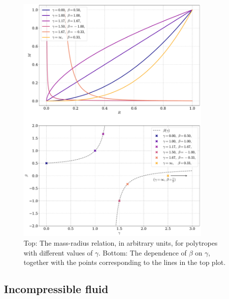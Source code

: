 \begin{figure}
    \centering
    \includegraphics[width=0.85\textwidth]{../scripts/figurer/mass_radius_relation_polytropes.pdf}
    \caption{
        Top: The mass-radius relation, in arbitrary units, for polytropes with different values of $\gamma$. Bottom: The dependence of $\beta$ on $\gamma$, together with the points corresponding to the lines in the top plot.
        }
    \label{fig: mass radius relation polytropes} 
\end{figure}



\subsection{Incompressible fluid}
\label{subsection: incompressible fluid}


